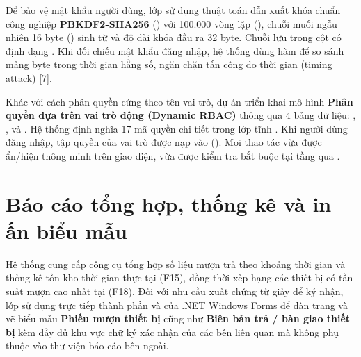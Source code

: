 Để bảo vệ mật khẩu người dùng, lớp  sử dụng thuật toán dẫn xuất khóa chuẩn công nghiệp \textbf{PBKDF2-SHA256} () với 100.000 vòng lặp (), chuỗi muối ngẫu nhiên 16 byte () sinh từ  và độ dài khóa đầu ra 32 byte. Chuỗi lưu trong cột  có định dạng . Khi đối chiếu mật khẩu đăng nhập, hệ thống dùng hàm  để so sánh mảng byte trong thời gian hằng số, ngăn chặn tấn công đo thời gian (timing attack) [7].


Khác với cách phân quyền cứng theo tên vai trò, dự án triển khai mô hình \textbf{Phân quyền dựa trên vai trò động (Dynamic RBAC)} thông qua 4 bảng dữ liệu: , ,  và . Hệ thống định nghĩa 17 mã quyền chi tiết trong lớp tĩnh . Khi người dùng đăng nhập, tập quyền của vai trò được nạp vào  (). Mọi thao tác vừa được ẩn/hiện thông minh trên giao diện, vừa được kiểm tra bắt buộc tại tầng  qua .


\section{Báo cáo tổng hợp, thống kê và in ấn biểu mẫu}

Hệ thống cung cấp công cụ tổng hợp số liệu mượn trả theo khoảng thời gian và thống kê tồn kho thời gian thực tại  (F15), đồng thời xếp hạng các thiết bị có tần suất mượn cao nhất tại  (F18). Đối với nhu cầu xuất chứng từ giấy để ký nhận, lớp  sử dụng trực tiếp thành phần  và  của .NET Windows Forms để dàn trang và vẽ biểu mẫu \textbf{Phiếu mượn thiết bị} cũng như \textbf{Biên bản trả / bàn giao thiết bị} kèm đầy đủ khu vực chữ ký xác nhận của các bên liên quan mà không phụ thuộc vào thư viện báo cáo bên ngoài.

